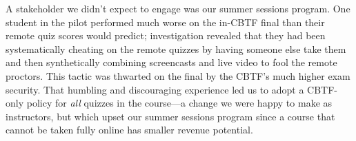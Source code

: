 \label{sec:cheating}
A stakeholder we didn't expect to engage was our summer sessions program.
One student in the pilot performed much worse on the in-CBTF final than their  remote
quiz scores would predict;
investigation revealed that they had been systematically cheating on
the remote quizzes by having someone else take them and then
synthetically combining screencasts and live video to fool the remote
proctors.
This tactic was thwarted on the final by the CBTF's much higher exam
security.
That humbling and discouraging experience led us to 
adopt a CBTF-only policy for \emph{all\/} quizzes in the course---a change we were 
happy to make as instructors,
but which upset our summer sessions program since a course that cannot be
taken fully online has smaller revenue potential.

